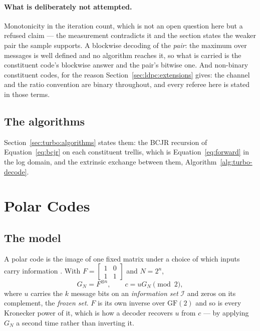 \documentclass[11pt,a4paper]{article}
\begin{document}
\paragraph{What is deliberately not attempted.}
Monotonicity in the iteration count, which is not an open question here but a
refused claim --- the measurement contradicts it and the section states the
weaker pair the sample supports. A blockwise decoding of the \emph{pair}: the
maximum over messages is well defined and no algorithm reaches it, so what is
carried is the constituent code's blockwise answer and the pair's bitwise one.
And non-binary constituent codes, for the reason
Section~\ref{sec:ldpc:extensions} gives: the channel and the ratio convention
are binary throughout, and every referee here is stated in those terms.

\subsection{The algorithms}
Section~\ref{sec:turbo:algorithms} states them: the BCJR
recursion of Equation~\ref{eq:bcjr} on each constituent trellis, which is
Equation~\ref{eq:forward} in the log domain, and the extrinsic exchange between
them, Algorithm~\ref{alg:turbo-decode}.

\section{Polar Codes}
\label{sec:polar}

\subsection{The model}
\label{sec:polar:model}
A polar code is the image of one fixed matrix under a choice of which inputs
carry information \citep{arikan2009}. With
$F = \begin{bmatrix} 1 & 0 \\ 1 & 1\end{bmatrix}$ and $N = 2^{n}$,
\begin{equation}
  G_N = F^{\otimes n}, \qquad c = u G_N \pmod 2,
  \label{eq:polar-transform}
\end{equation}
where $u$ carries the $k$ message bits on an \emph{information set}
$\mathcal{I}$ and zeros on its complement, the \emph{frozen set}. $F$ is its
own inverse over $\mathrm{GF}(2)$ and so is every Kronecker power of it, which
is how a decoder recovers $u$ from $c$ --- by applying $G_N$ a second time
rather than inverting it.
\end{document}
